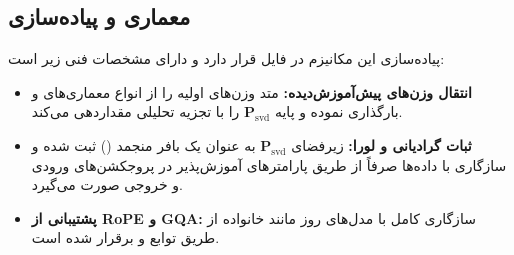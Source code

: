 \subsection{معماری و پیاده‌سازی}
پیاده‌سازی این مکانیزم در فایل  قرار دارد و دارای مشخصات فنی زیر است:
\begin{itemize}
    \item \textbf{انتقال وزن‌های پیش‌آموزش‌دیده:} متد  وزن‌های اولیه را از انواع معماری‌های  و  بارگذاری نموده و پایه $\mathbf{P}_{\text{svd}}$ را با تجزیه تحلیلی مقداردهی می‌کند.
    \item \textbf{ثبات گرادیانی و لورا:} زیرفضای $\mathbf{P}_{\text{svd}}$ به عنوان یک بافر منجمد () ثبت شده و سازگاری با داده‌ها صرفاً از طریق پارامترهای آموزش‌پذیر  در پروجکشن‌های ورودی و خروجی صورت می‌گیرد.
    \item \textbf{پشتیبانی از RoPE و GQA:} سازگاری کامل با مدل‌های روز مانند خانواده  از طریق توابع  و  برقرار شده است.
\end{itemize}
